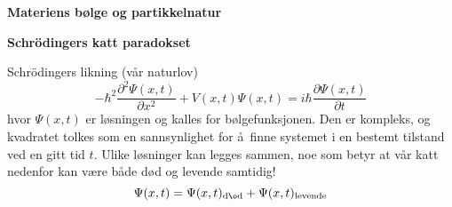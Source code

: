 
\begin{center}
   \begin{minipage}{0.8\textwidth}
       \vspace*{0.5cm}
       \begin{center}
            { \LARGE \bf Materiens b\o lge og partikkelnatur}
       \end{center}

\end{minipage}
\end{center}


\Large
\begin{center}
   \begin{minipage}{0.8\textwidth}
       \vspace*{0.5cm}
       \begin{center}
            { \LARGE \bf Schr\"odingers katt paradokset}
       \end{center}
\LARGE
Schr\"odingers likning (v\aa r naturlov)
\[
   -\hbar^2\frac{\partial^2\Psi(x,t)}{\partial x^2}+V(x,t)\Psi(x,t)=
    i\hbar\frac{\partial\Psi(x,t)}{\partial t}
\]
hvor $\Psi(x,t)$ er l\o sningen og kalles for b\o lgefunksjonen. Den er kompleks, og kvadratet tolkes som en sannsynlighet for \aa\ finne systemet i en bestemt
tilstand ved en gitt tid $t$. Ulike l\o sninger kan legges sammen, noe som
betyr at v\aa r katt nedenfor kan  v\ae re b\aa de d\o d og levende
samtidig!
\[
   \Psi(x,t)=\Psi(x,t)_{\mathrm{d\o d}}+\Psi(x,t)_{\mathrm{levende}}
\]
\end{minipage}
\end{center}




